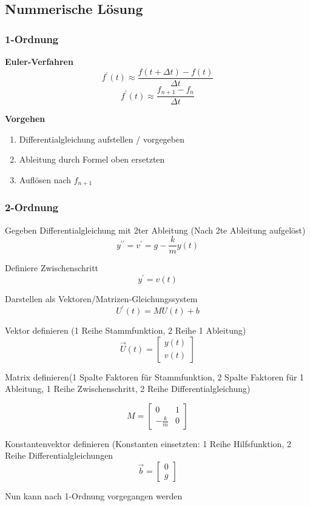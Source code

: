 \subsection{Nummerische Lösung}
\subsubsection{1-Ordnung}
\textbf{Euler-Verfahren}
$$ f^{\prime}(t) \approx \frac{f(t+\Delta t) - f(t)}{\Delta t} $$
$$ f^{\prime}(t) \approx \frac{f_{n+1}-f_{n}}{\Delta t}$$

\textbf{Vorgehen}
\begin{enumerate}
    \item Differentialgleichung aufstellen / vorgegeben
    \item Ableitung durch Formel oben ersetzten
    \item Auflösen nach $f_{n+1}$
\end{enumerate}

\subsubsection{2-Ordnung}
Gegeben Differentialgleichung mit 2ter Ableitung (Nach 2te Ableitung aufgelöst)
$$ y^{\prime\prime} = v^{\prime} = g-\frac{k}{m} y(t) $$

Definiere Zwischenschritt
$$ y^{\prime} = v(t) $$

Darstellen als Vektoren/Matrizen-Gleichungssystem 
$$ U^{\prime}(t) = MU(t) + b $$

Vektor definieren (1 Reihe Stammfunktion, 2 Reihe 1 Ableitung)
$$ \vec{U}(t) = \begin{bmatrix} y(t) \\ v(t) \end{bmatrix} $$
 
Matrix definieren(1 Spalte Faktoren für  Stammfunktion, 2 Spalte Faktoren für 1 Ableitung, 1 Reihe Zwischenschritt, 2 Reihe Differentialgleichung)

$$ M = \begin{bmatrix} 0 & 1 \\ -\frac{k}{m} & 0 \end{bmatrix} $$

Konstantenvektor definieren (Konstanten einsetzten: 1 Reihe Hilfsfunktion, 2 Reihe Differentialgleichungen
 $$ \vec{b} = \begin{bmatrix} 0 \\ g \end{bmatrix} $$

Nun kann nach 1-Ordnung vorgegangen werden